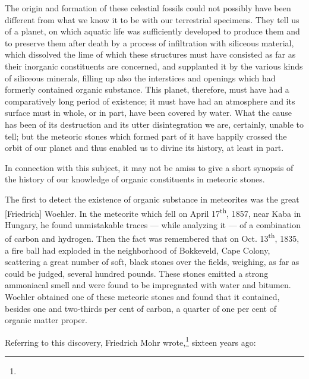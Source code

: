 \documentclass[a4paper, 12pt, oneside]{article}
\begin{document}
The origin and formation of these celestial fossils could not possibly have been different from what we know it to be with our terrestrial specimens. They tell us of a planet, on which aquatic life was sufficiently developed to produce them and to preserve them after death by a process of infiltration with siliceous material, which dissolved the lime of which these structures must have consisted as far as their inorganic constituents are concerned, and supplanted it by the various kinds of siliceous minerals, filling up also the interstices and openings which had formerly contained organic substance. This planet, therefore, must have had a comparatively long period of existence; it must have had an atmosphere and its surface must in whole, or in part, have been covered by water. What the cause has been of its destruction and its utter disintegration we are, certainly, unable to tell; but the meteoric stones which formed part of it have happily crossed the orbit of our planet and thus enabled us to divine its history, at least in part.

In connection with this subject, it may not be amiss to give a short synopsis of the history of our knowledge of organic constituents in meteoric stones.

The first to detect the existence of organic substance in meteorites was the great [Friedrich] Woehler. In the meteorite which fell on April 17\textsuperscript{th}, 1857, near Kaba in Hungary, he found unmistakable traces --- while analyzing it --- of a combination of carbon and hydrogen. Then the fact was remembered that on Oct. 13\textsuperscript{th}, 1835, a fire ball had exploded in the neighborhood of Bokkeveld, Cape Colony, scattering a great number of soft, black stones over the fields, weighing, as far as could be judged, several hundred pounds. These stones emitted a strong ammoniacal smell and were found to be impregnated with water and bitumen. Woehler obtained one of these meteoric stones and found that it contained, besides one and two-thirds per cent of carbon, a quarter of one per cent of organic matter proper.

Referring to this discovery, Friedrich Mohr wrote,\footnote{} sixteen years ago:
\end{document}
